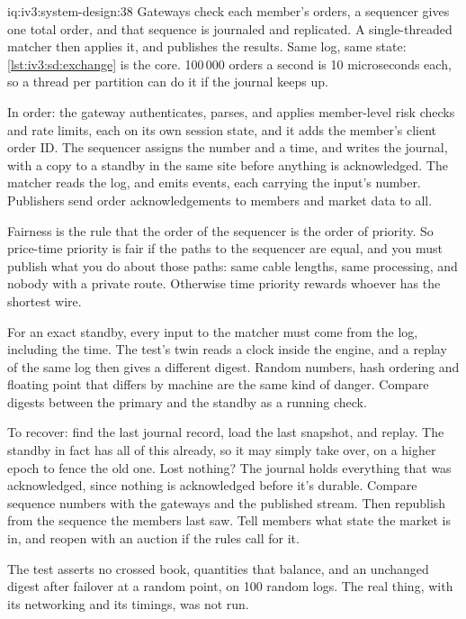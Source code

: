 \begin{solution}{iq:iv3:system-design:38}
Gateways check each member's orders, a sequencer gives one total order, and that sequence is journaled and replicated. A single-threaded matcher then applies it, and publishes the results. Same log, same state: \cref{lst:iv3:sd:exchange} is the core. 100\,000 orders a second is 10 microseconds each, so a thread per partition can do it if the journal keeps up.
\label{lst:iv3:sd:exchange}

In order: the gateway authenticates, parses, and applies member-level risk checks and rate limits, each on its own session state, and it adds the member's client order ID. The sequencer assigns the number and a time, and writes the journal, with a copy to a standby in the same site before anything is acknowledged. The matcher reads the log, and emits events, each carrying the input's number. Publishers send order acknowledgements to members and market data to all.

Fairness is the rule that the order of the sequencer is the order of priority. So price-time priority is fair if the paths to the sequencer are equal, and you must publish what you do about those paths: same cable lengths, same processing, and nobody with a private route. Otherwise time priority rewards whoever has the shortest wire.

For an exact standby, every input to the matcher must come from the log, including the time. The test's twin reads a clock inside the engine, and a replay of the same log then gives a different digest. Random numbers, hash ordering and floating point that differs by machine are the same kind of danger. Compare digests between the primary and the standby as a running check.

To recover: find the last journal record, load the last snapshot, and replay. The standby in fact has all of this already, so it may simply take over, on a higher epoch to fence the old one. Lost nothing? The journal holds everything that was acknowledged, since nothing is acknowledged before it's durable. Compare sequence numbers with the gateways and the published stream. Then republish from the sequence the members last saw. Tell members what state the market is in, and reopen with an auction if the rules call for it.

The test asserts no crossed book, quantities that balance, and an unchanged digest after failover at a random point, on 100 random logs. The real thing, with its networking and its timings, was not run.

\end{solution}

